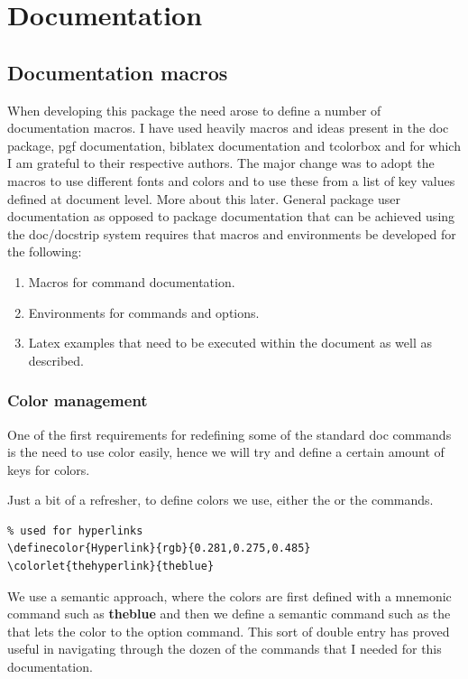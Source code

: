 \thispagestyle{plain}
\chapter{Documentation}


\section{Documentation macros}

When developing this package the need arose to define a number of documentation macros. I have used heavily macros and ideas present in the doc package, pgf documentation, biblatex documentation  and tcolorbox and for which I am grateful to their respective authors. The major change was to adopt the macros to use different fonts and colors and to use these from a list of key values defined at document level. More about this later. General package user documentation as opposed to package documentation that can be achieved using the doc/docstrip system requires that macros and environments be developed for the following:

\begin{enumerate}
\item Macros for command documentation.
\item Environments for commands and options.
\item Latex examples that need to be executed within the document as well as described.
\end{enumerate}

\subsection{Color management}
One of the first requirements for redefining some of the standard doc commands is the need to use color easily, hence we will try and define a certain amount of keys for colors.

Just a bit of a refresher, to define colors we use, either the  or the  commands.

\begin{tcolorbox}
\begin{lstlisting}
% used for hyperlinks
\definecolor{Hyperlink}{rgb}{0.281,0.275,0.485}
\colorlet{thehyperlink}{theblue}
\end{lstlisting}
\end{tcolorbox}

We use a semantic approach, where the colors are first defined with a mnemonic command such as {\bfseries\textcolor{theblue}{theblue}} and then we define a semantic command such as the that lets the color to the option command. This sort of double entry has proved useful in navigating through the dozen of the commands that I needed for this documentation.

